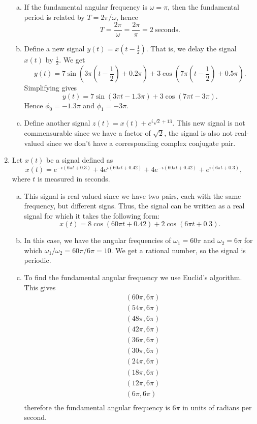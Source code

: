 \begin{enumerate}
\begin{enumerate}[a)]
\item If the fundamental angular frequency is $\omega=\pi$, then the fundamental period is related by $T=2\pi/\omega$, hence
$$T=\frac{2\pi}{\omega}=\frac{2\pi}{\pi}=2\ \text{seconds}.$$

\item Define a new signal $y(t)=x(t-\frac{1}{2})$. That is, we delay the signal $x(t)$ by $\frac{1}{2}$. We get
$$y(t)=7\sin(3\pi \left(t-\frac{1}{2}\right)+0.2\pi)+3\cos(7\pi \left(t-\frac{1}{2}\right)+0.5\pi).$$
Simplifying gives
$$y(t)=7\sin(3\pi t-1.3\pi)+3\cos(7\pi t-3\pi).$$
Hence $\phi_{0}=-1.3\pi$ and $\phi_{1}=-3\pi$. 

\item Define another signal $z(t)=x(t)+e^{i\sqrt{2}+13}$. This new signal is not commensurable since we have a factor of $\sqrt{2}$, the signal is also not real-valued since we don't have a corresponding complex conjugate pair. 
\end{enumerate}

\item Let $x(t)$ be a signal defined as
$$x(t)=e^{-i(6\pi t+0.3)}+4e^{i(60\pi t+0.42)}+4e^{-i(60\pi t+0.42)}+e^{i(6\pi t+0.3)},$$
where $t$ is measured in seconds. 
\begin{enumerate}[a)]
\item This signal is real valued since we have two pairs, each with the same frequency, but different signs. Thus, the signal can be written as a real signal for which it takes the following form:
$$x(t)=8\cos(60\pi t+0.42)+2\cos(6\pi t+0.3).$$
\item In this case, we have the angular frequencies of $\omega_{1}=60\pi$ and $\omega_{2}=6\pi$ for which $\omega_{1}/\omega_{2}=60\pi/6\pi=10$. We get a rational number, so the signal is periodic. 
\item To find the fundamental angular frequency we use Euclid's algorithm. This gives
\begin{align*}
    &(60\pi,6\pi) \\
    &(54\pi,6\pi) \\
    &(48\pi,6\pi) \\
    &(42\pi,6\pi) \\
    &(36\pi,6\pi) \\
    &(30\pi,6\pi) \\
    &(24\pi,6\pi) \\
    &(18\pi,6\pi) \\
    &(12\pi,6\pi) \\
    &(6\pi,6\pi) \\
\end{align*}
therefore the fundamental angular frequency is $6\pi$ in units of radians per second. 


\end{enumerate}
\end{enumerate}
